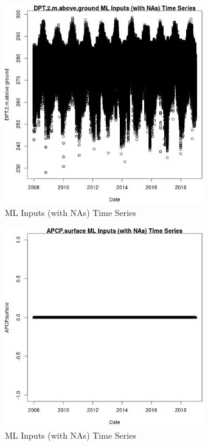 \begin{figure} 
\centering  
\includegraphics[width=0.77\textwidth]{Code_Outputs/Report_ML_input_PM25_Step4_part_f_de_duplicated_aveswNAs_DPT2mabovegroundvDate.jpg} 
\caption{\label{fig:Report_ML_input_PM25_Step4_part_f_de_duplicated_aveswNAsDPT2mabovegroundvDate}ML Inputs (with NAs) Time Series} 
\end{figure} 
 

\clearpage 

\begin{figure} 
\centering  
\includegraphics[width=0.77\textwidth]{Code_Outputs/Report_ML_input_PM25_Step4_part_f_de_duplicated_aveswNAs_APCPsurfacevDate.jpg} 
\caption{\label{fig:Report_ML_input_PM25_Step4_part_f_de_duplicated_aveswNAsAPCPsurfacevDate}ML Inputs (with NAs) Time Series} 
\end{figure} 
 

